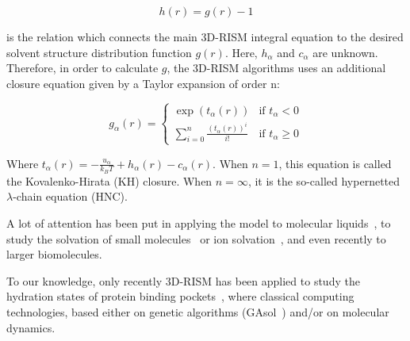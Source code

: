\documentclass[fleqn,10pt]{wlscirep}
\begin{document}
\begin{equation}
    h(r) = g(r) - 1
\end{equation}

is the relation which connects the main 3D-RISM integral equation to the desired solvent structure distribution function $g(r)$. 
Here, $h_\alpha$ and $c_\alpha$ are unknown. Therefore, in order to calculate $g$, the 3D-RISM algorithms uses an additional closure equation given by a Taylor expansion of order n:

\begin{equation}
    g_\alpha(r) = \left\{ \begin{array}{ll} \exp(t_\alpha(r)) & \text{if }  t_\alpha < 0 \\ \sum_{i=0}^{n} \frac{(t_\alpha(r))^i}{i!} & \text{if }  t_\alpha \geq 0 \end{array} \right.
\end{equation}

Where $t_\alpha(r) = -\frac{u_\alpha}{k_B T} + h_\alpha(r)-c_\alpha(r)$. When  $n=1$, this equation is called the Kovalenko-Hirata (KH) closure. When $n=\infty$, it is the so-called hypernetted $\lambda$-chain equation (HNC).

A lot of attention has been put in applying the model to molecular liquids~\cite{kinoshita_application_1996,roy_application_2020}, to study the solvation of
small molecules~\cite{truchon_cavity_2014,johnson_small_2016} or ion solvation~\cite{kovalenko_potentials_2000}, and even recently to larger biomolecules.~\cite{imai_ligand_2009,luchko_three-dimensional_2010,perkyns_protein_2010,sindhikara_analysis_2013}

To our knowledge, only recently 3D-RISM has been applied to study the hydration states of protein binding pockets~\cite{masters_efficient_2018,fusani_optimal_2018SI,nguyen_molecular_2019}, where classical computing technologies, based either on genetic algorithms (GAsol~\cite{masters_efficient_2018,fusani_optimal_2018SI}) and/or on molecular dynamics.~\cite{masters_efficient_2018,nguyen_molecular_2019} 



 
\end{document}
